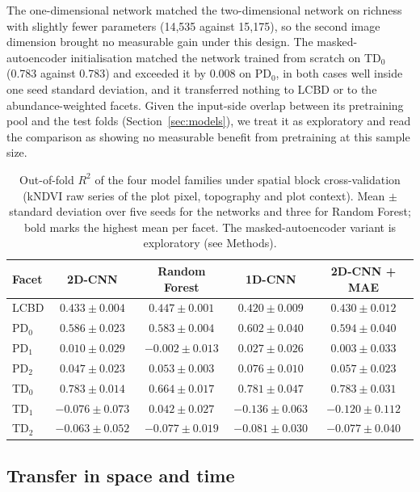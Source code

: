 \documentclass[preprint,12pt]{elsarticle}
\begin{document}
The one-dimensional network matched the two-dimensional network on richness with slightly
fewer parameters (14,535 against 15,175), so the second image dimension brought no
measurable gain under this design. The masked-autoencoder initialisation matched the
network trained from scratch on TD$_0$ (0.783 against 0.783) and exceeded it by 0.008 on
PD$_0$, in both cases well inside one seed standard deviation, and it transferred nothing
to LCBD or to the abundance-weighted facets. Given the input-side overlap between its
pretraining pool and the test folds (Section~\ref{sec:models}), we treat it as exploratory
and read the comparison as showing no measurable benefit from pretraining at this sample
size.

\begin{table}[t]
\centering
\small
\caption{Out-of-fold $R^2$ of the four model families under spatial block cross-validation
(kNDVI raw series of the plot pixel, topography and plot context). Mean $\pm$ standard deviation
over five seeds for the networks and three for Random Forest; bold marks the highest mean
per facet. The masked-autoencoder variant is exploratory (see Methods).}
\label{tab:families}
\begin{tabular}{lcccc}
\toprule
Facet & 2D-CNN & Random Forest & 1D-CNN & 2D-CNN + MAE \\
\midrule
LCBD   & $0.433\pm0.004$ & $\mathbf{0.447\pm0.001}$ & $0.420\pm0.009$ & $0.430\pm0.012$ \\
PD$_0$ & $0.586\pm0.023$ & $0.583\pm0.004$ & $\mathbf{0.602\pm0.040}$ & $0.594\pm0.040$ \\
PD$_1$ & $0.010\pm0.029$ & $-0.002\pm0.013$ & $\mathbf{0.027\pm0.026}$ & $0.003\pm0.033$ \\
PD$_2$ & $0.047\pm0.023$ & $0.053\pm0.003$ & $\mathbf{0.076\pm0.010}$ & $0.057\pm0.023$ \\
TD$_0$ & $\mathbf{0.783\pm0.014}$ & $0.664\pm0.017$ & $0.781\pm0.047$ & $0.783\pm0.031$ \\
TD$_1$ & $-0.076\pm0.073$ & $\mathbf{0.042\pm0.027}$ & $-0.136\pm0.063$ & $-0.120\pm0.112$ \\
TD$_2$ & $-0.063\pm0.052$ & $-0.077\pm0.019$ & $-0.081\pm0.030$ & $-0.077\pm0.040$ \\
\bottomrule
\end{tabular}
\end{table}

\subsection{Transfer in space and time}
\label{sec:results_llto}
\end{document}
